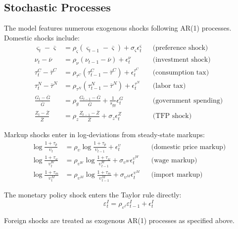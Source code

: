 \documentclass[12pt]{article}
\begin{document}
\subsection{Stochastic Processes}

The model features numerous exogenous shocks following AR(1) processes. Domestic shocks include:
\begin{align}
\varsigma_t - \overline{\varsigma} &= \rho_\varsigma (\varsigma_{t-1} - \overline{\varsigma}) + \sigma_\varsigma \epsilon_t^\varsigma && \text{(preference shock)} \\
\nu_t - \overline{\nu} &= \rho_\nu (\nu_{t-1} - \overline{\nu}) + \epsilon_t^\nu && \text{(investment shock)} \\
\tau_t^C - \overline{\tau}^C &= \rho_{\tau^C} (\tau_{t-1}^C - \overline{\tau}^C) + \epsilon_t^{\tau^C} && \text{(consumption tax)} \\
\tau_t^N - \overline{\tau}^N &= \rho_{\tau^N} (\tau_{t-1}^N - \overline{\tau}^N) + \epsilon_t^{\tau^N} && \text{(labor tax)} \\
\frac{G_t - \overline{G}}{\overline{G}} &= \rho_g \frac{G_{t-1} - \overline{G}}{\overline{G}} + \frac{1}{s_{gy}} \epsilon_t^G && \text{(government spending)} \\
\frac{Z_t - \overline{Z}}{\overline{Z}} &= \rho_z \frac{Z_{t-1} - \overline{Z}}{\overline{Z}} + \sigma_z \epsilon_t^Z && \text{(TFP shock)}
\end{align}

Markup shocks enter in log-deviations from steady-state markups:
\begin{align}
\log \frac{1+\tau_p}{\upsilon_t} &= \rho_\upsilon \log \frac{1+\tau_p}{\upsilon_{t-1}} + \epsilon_t^\upsilon && \text{(domestic price markup)} \\
\log \frac{1+\tau_w}{\upsilon_t^W} &= \rho_{\upsilon^W} \log \frac{1+\tau_w}{\upsilon_{t-1}^W} + \sigma_{\upsilon^W} \epsilon_t^{\upsilon^W} && \text{(wage markup)} \\
\log \frac{1+\tau_m}{\upsilon_t^M} &= \rho_{\upsilon^M} \log \frac{1+\tau_m}{\upsilon_{t-1}^M} + \sigma_{\upsilon^M} \epsilon_t^{\upsilon^M} && \text{(import markup)}
\end{align}

The monetary policy shock enters the Taylor rule directly:
\begin{equation}
\varepsilon_t^I = \rho_{\varepsilon^I} \varepsilon_{t-1}^I + \epsilon_t^I
\end{equation}

Foreign shocks are treated as exogenous AR(1) processes as specified above.
\end{document}
